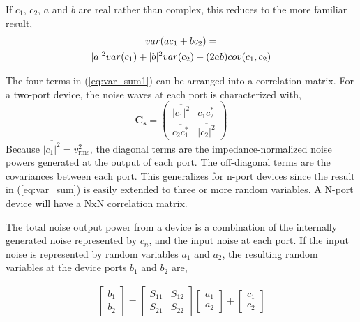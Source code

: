\documentclass[journal]{IEEEtran}
\begin{document}
If \(c_1\), \(c_2\), \(a\) and \(b\) are real rather than complex, this reduces to the more familiar result,
\begin{gather}
var(ac_1+bc_2) = \notag\\
|a|^2 var(c_1) + |b|^2 var(c_2) +  (2ab)cov(c_1, c_2)
\end{gather}
%

The four terms in (\ref{eq:var_sum1}) can be arranged into a correlation matrix. For a two-port device, the noise waves at each port is characterized with,
\[ \mathbf{C_s} =
\begin{pmatrix}
\overline{|c_1|^2} & \overline{c_1c_2^*} \\
\overline{c_2c_1^*} & \overline{|c_2|^2}
\end{pmatrix}
\]
%
Because \(\overline{|c_1|^2} = v_\textrm{rms}^2\), the diagonal terms are the impedance-normalized noise powers generated at the output of each port. The off-diagonal terms are the covariances between each port. This generalizes for n-port devices since the result in (\ref{eq:var_sum}) is easily extended to three or more random variables. A N-port device will have a NxN correlation matrix.

The total noise output power from a device is a combination of the internally generated noise represented by \(c_n\), and the input noise at each port. If the input noise is represented by random variables \(a_1\) and \(a_2\), the resulting random variables at the device ports \(b_1\) and \(b_2\) are,

\begin{gather}
	\begin{bmatrix}
	b_1 \\
	b_2 
	\end{bmatrix}=
	\begin{bmatrix}
	S_{11} & S_{12} \\
	S_{21} & S_{22}
	\end{bmatrix}
	\begin{bmatrix}
	a_1 \\
	a_2 
	\end{bmatrix} +
	\begin{bmatrix}
	c_1 \\
	c_2 
	\end{bmatrix}
	\label{eq:b_matrix}
\end{gather}
\end{document}
